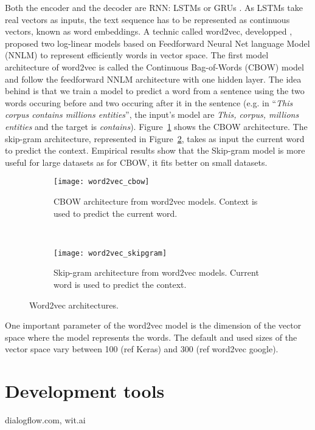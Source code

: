 Both the encoder and the decoder are RNN: LSTMs \citep{1409.3215,1508.04025} or GRUs \citep{1706.05125,1503.02364}. As LSTMs take real vectors as inputs, the text sequence has to be represented as continuous vectors, known as word embeddings. A technic called word2vec, developped \citep{1301.3781}, proposed two log-linear models based on Feedforward Neural Net language Model (NNLM) to represent efficiently words in vector space. The first model architecture of word2vec is called the Continuous Bag-of-Words (CBOW) model and follow the feedforward NNLM architecture with one hidden layer. The idea behind is that we train a model to predict a word from a sentence using the two words occuring before and two occuring after it in the sentence (e.g. in ``\textit{This corpus contains millions entities}'', the input's model are \textit{This, corpus, millions entities} and the target is \textit{contains}). Figure~\ref{fig:cbow} shows the CBOW architecture. The skip-gram architecture, represented in Figure~\ref{fig:skipgram}, takes as input the current word to predict the context. Empirical results \citep{tf.word2vec} show that the Skip-gram model is more useful for large datasets as for CBOW, it fits better on small datasets.

\begin{figure}
    \centering
    \begin{subfigure}{.45\textwidth}
        \centering
        \texttt{[image: word2vec\_cbow]}
        \caption{CBOW architecture from word2vec models. Context is used to predict the current word.}
        \label{fig:cbow}
    \end{subfigure}
    ~
    \begin{subfigure}{.45\textwidth}
        \centering
        \texttt{[image: word2vec\_skipgram]}
        \caption{Skip-gram architecture from word2vec models. Current word is used to predict the context.}
        \label{fig:skipgram}
    \end{subfigure}
    \caption{Word2vec architectures.}
    \label{fig:word2vec}
\end{figure}

One important parameter of the word2vec model is the dimension of the vector space where the model represents the words. The default and used sizes of the vector space vary between 100 (ref Keras) and 300 (ref word2vec google).

\section{Development tools}
dialogflow.com, wit.ai

